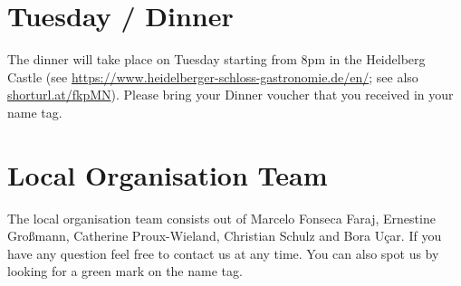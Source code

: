 \documentclass{article}
\begin{document}
\section{Tuesday / Dinner}
The dinner will take place on Tuesday starting from 8pm in the Heidelberg Castle (see \url{https://www.heidelberger-schloss-gastronomie.de/en/}; see also \url{shorturl.at/fkpMN}). Please bring your Dinner voucher that you received in your name tag. 

\section{Local Organisation Team}
The local organisation team consists out of Marcelo Fonseca Faraj, Ernestine Großmann, Catherine Proux-Wieland, Christian Schulz and Bora Uçar. If you have any question feel free to contact us at any time. You can also spot us by looking for a green mark on the name tag.
\end{document}
